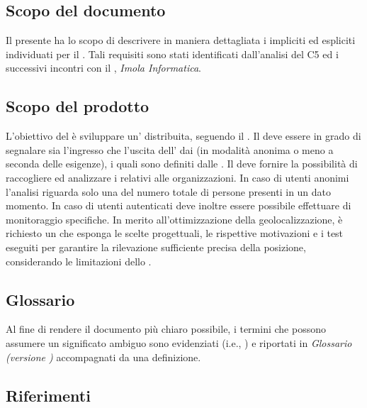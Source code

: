 \documentclass[../analisi-dei-requisiti.tex]{subfiles}
\begin{document}
\subsection{Scopo del documento}%
\label{sub:scopo_del_documento}
Il presente  ha lo scopo di descrivere in maniera dettagliata i  impliciti ed espliciti individuati per il . Tali requisiti sono stati identificati dall'analisi del  C5 ed i successivi incontri con il , \textit{Imola Informatica}.

\subsection{Scopo del prodotto}%
\label{sub:scopo_del_prodotto}
L'obiettivo del  è sviluppare un' distribuita, seguendo il .
Il  deve essere in grado di segnalare sia l'ingresso che l'uscita dell' dai  (in modalità anonima o meno a seconda delle esigenze), i quali sono definiti dalle .
Il  deve fornire la possibilità di raccogliere ed analizzare i  relativi alle organizzazioni.
In caso di utenti anonimi l'analisi riguarda solo una  del numero totale di persone presenti in un dato momento.
In caso di utenti autenticati deve inoltre essere possibile effettuare  di monitoraggio specifiche.
In merito all'ottimizzazione della geolocalizzazione, è richiesto un  che esponga le scelte progettuali, le rispettive motivazioni e i test eseguiti per garantire la rilevazione sufficiente precisa della posizione, considerando le limitazioni dello .


\subsection{Glossario}%
\label{sub:glossario}
Al fine di rendere il documento più chiaro possibile, i termini che possono assumere un significato ambiguo sono evidenziati (i.e., ) e riportati in \textit{Glossario (versione \versione)} accompagnati da una definizione.

\subsection{Riferimenti}%
\label{sub:riferimenti}
\end{document}
